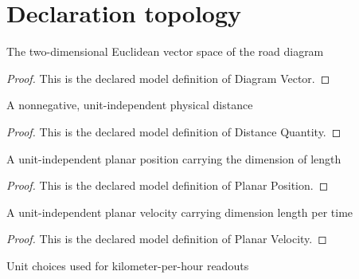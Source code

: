 \section{Declaration topology}
\begin{definition}
  \label{def:physics:phyx-mini-0748:phyxminiproblems-problemphyxmini0748-diagramvector}
  The two-dimensional Euclidean vector space of the road diagram
\end{definition}
\begin{proof}
  This is the declared model definition of Diagram Vector.
\end{proof}
\begin{definition}
  \label{def:physics:phyx-mini-0748:phyxminiproblems-problemphyxmini0748-distancequantity}
  A nonnegative, unit-independent physical distance
\end{definition}
\begin{proof}
  This is the declared model definition of Distance Quantity.
\end{proof}
\begin{definition}
  \label{def:physics:phyx-mini-0748:phyxminiproblems-problemphyxmini0748-planarposition}
  A unit-independent planar position carrying the dimension of length
\end{definition}
\begin{proof}
  This is the declared model definition of Planar Position.
\end{proof}
\begin{definition}
  \label{def:physics:phyx-mini-0748:phyxminiproblems-problemphyxmini0748-planarvelocity}
  A unit-independent planar velocity carrying dimension length per time
\end{definition}
\begin{proof}
  This is the declared model definition of Planar Velocity.
\end{proof}
\begin{definition}
  \label{def:physics:phyx-mini-0748:phyxminiproblems-problemphyxmini0748-kilometerhourunits}
  Unit choices used for kilometer-per-hour readouts
\end{definition}
